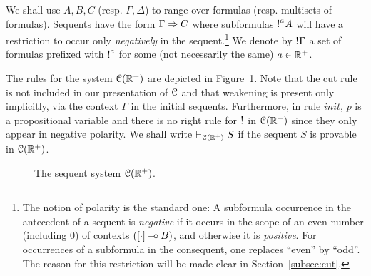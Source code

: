 We shall use $A,B,C$ (resp. $\Gamma,\Delta$) to range over formulas (resp. multisets of formulas).  
Sequents have the form $\Gamma\Rightarrow C$ where subformulas $\hbox{$\mathop{!}^{a}$}A$ will have a restriction to occur only {\em negatively} in the sequent.\footnote{The notion of polarity  is the standard one: A subformula occurrence in the antecedent of a sequent is {\em negative} if it occurs in the scope of an even number (including $0$) of contexts $([\cdot]\mathbin{-\hspace{-0.70mm}\circ} B)$, and otherwise it is {\em positive}. For occurrences of a subformula in the consequent, one replaces ``even'' by ``odd''. The reason for this restriction will be made clear in Section~\ref{subsec:cut}.}
%
We denote by $\hbox{$\mathop{!}^{}$}\Gamma$ a set of formulas  prefixed with $\hbox{$\mathop{!}^{a}$}$ for some (not necessarily the same) $a\in\mathbb{R}^+$. 

The rules for the system $\mathcal{C}(\mathbb{R}^+)$ are depicted in Figure~\ref{fig:ll}. Note that the cut rule is not included in our presentation of $\mathcal{C}$ and that weakening is present only implicitly, via the context $\Gamma$ in the initial sequents. Furthermore, in rule $init$, $p$ is a propositional variable and there is no right rule for $\hbox{$\mathop{!}^{}$}$ in $\mathcal{C}(\mathbb{R}^+)$ since they only appear in negative polarity.
We shall write $\vdash_{\mathcal{C}(\mathbb{R}^+)} S$ if the sequent $S$ is provable in $\mathcal{C}(\mathbb{R}^+)$.

\begin{figure}[t]
\caption{The sequent system $\mathcal{C}(\mathbb{R}^+)$.}
\label{fig:ll}
\end{figure}

